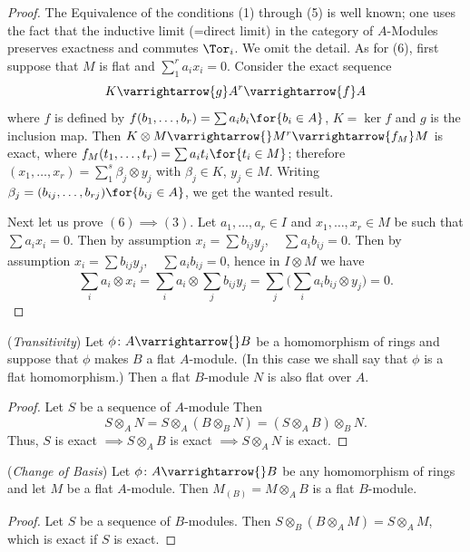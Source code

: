 \documentclass[../main]{subfiles}
\begin{document}
\begin{proof}
    The Equivalence of the conditions (1) through (5) is well known; one uses the fact that the inductive limit (=direct limit) in the category of $A$-Modules preserves exactness and commutes $\Tor_i$. We omit the detail. As for (6), first suppose that $M$ is flat and $\sum_1^r a_i x_i = 0$. Consider the exact sequence
    \[
        K \varrightarrow{g} A^r \varrightarrow{f} A
    \]
    where $f$ is defined by $f(b_1,\ldots, b_r) = \sum a_i b_i\for{b_i \in A}$, $K = \ker{f}$ and $g$ is the inclusion map. Then $K\otimes M \varrightarrow{} M^r \varrightarrow{f_M} M$ is exact, where \newline $f_M(t_1,\ldots,t_r) = \sum a_i t_i\for{t_i \in M}$; therefore $(x_1,\ldots,x_r) = \sum_1^s \beta_j \otimes y_j$ with $\beta_j \in K$, $y_j \in M$. Writing $\beta_j = (b_{ij},\ldots,b_{rj})\for{b_{ij} \in A}$, we get the wanted result.
    
    Next let us prove $(6) \implies (3)$. Let $a_1,\ldots,a_r \in I$ and $x_1,\ldots,x_r \in M$ be such that $\sum a_ix_i =0$. Then by assumption $x_i = \sum b_{ij}y_j, \quad \sum a_ib_{ij} = 0$. Then by assumption $x_i=\sum b_{ij}y_j,\quad  \sum a_ib_{ij} =0$, hence in $I\otimes M$ we have \[\sum_i a_i \otimes x_i= \sum_i a_i \otimes \sum_j b_{ij}y_j= \sum_j \bigg( \sum_ia_ib_{ij} \otimes y_j \bigg) = 0.\]
\end{proof}
 
\newparagraph (\emph{Transitivity}) Let $\phi\colon A \varrightarrow{} B  $ be a homomorphism of rings and suppose that $\phi$ makes $B$ a flat $A$-module. (In this case we shall say that $\phi$ is a flat homomorphism.) Then a flat $B$-module $N$ is also flat over $A$.

\begin{proof} 
    Let $S$ be a sequence of $A$-module Then 
    \[
        S \otimes_A N = S \otimes_A (B \otimes_B N) = (S \otimes_A B) \otimes_B N.
    \] 
    Thus, $S$ is exact $\implies S \otimes_A B$ is exact $\implies S \otimes_A N$ is exact.
\end{proof}

\newparagraph (\emph{Change of Basis}) Let $\phi\colon A \varrightarrow{} B$ be any homomorphism of rings and let $M$ be a flat $A$-module. Then $M_{(B)} = M \otimes_A B$ is a flat $B$-module.

\begin{proof}
    Let $S$ be a sequence of $B$-modules. Then $S \otimes_B (B \otimes_A M) = S \otimes_AM$, which is exact if $S$ is exact.
\end{proof}
\end{document}
